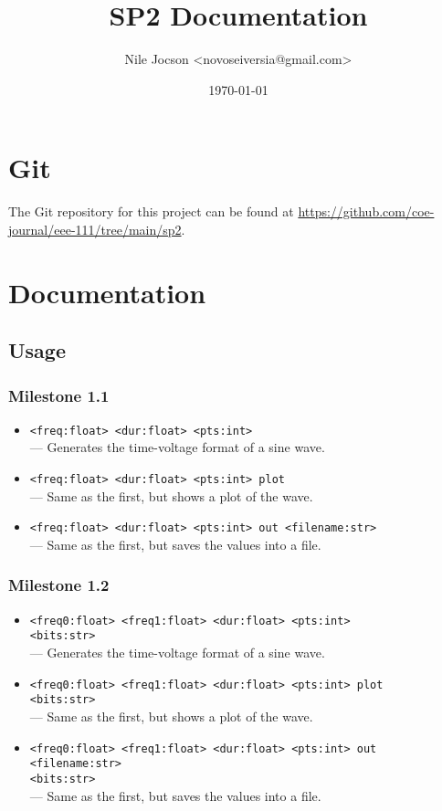 \documentclass{article}
\title{SP2 Documentation}
\author{Nile Jocson \textless{}novoseiversia@gmail.com\textgreater{}}
\date{\today}
\begin{document}
	\maketitle
		\pagebreak



	\tableofcontents
		\pagebreak



	\section{Git}
		The Git repository for this project can be found at
		\url{https://github.com/coe-journal/eee-111/tree/main/sp2}.

		\pagebreak



	\section{Documentation}
		\subsection{Usage}
			\subsubsection{Milestone 1.1}
				\begin{itemize}
					\item \verb|<freq:float> <dur:float> <pts:int>| \\
						--- Generates the time-voltage format of a sine wave.
					\item \verb|<freq:float> <dur:float> <pts:int> plot| \\
						--- Same as the first, but shows a plot of the wave.
					\item \verb|<freq:float> <dur:float> <pts:int> out <filename:str>| \\
						--- Same as the first, but saves the values into a file.
				\end{itemize}

			\subsubsection{Milestone 1.2}
				\begin{itemize}
					\item \verb|<freq0:float> <freq1:float> <dur:float> <pts:int>| \\
						\verb|<bits:str>| \\
						--- Generates the time-voltage format of a sine wave.
					\item \verb|<freq0:float> <freq1:float> <dur:float> <pts:int> plot| \\
						\verb|<bits:str>| \\
						--- Same as the first, but shows a plot of the wave.
					\item \verb|<freq0:float> <freq1:float> <dur:float> <pts:int> out <filename:str>| \\
						\verb|<bits:str>| \\
						--- Same as the first, but saves the values into a file.
				\end{itemize}
\end{document}
